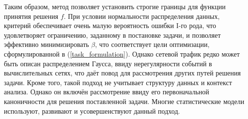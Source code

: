 Таким образом, метод позволяет установить строгие границы для функции принятия решения $f$. При условии нормальности распределения данных, критерий обеспечивает очень малую вероятность ошибки I-го рода, что удовлетворяет ограничению, заданному в постановке задачи, и позволяет эффективно минимизировать $\beta$, что соответствует цели оптимизации, сформулированной в (\ref{task_formulation}). Однако сетевой трафик редко может быть описан распределением Гаусса, ввиду нерегулярности событий в вычислительных сетях, что даёт повод для рассмотрения других путей решения задачи. Кроме того, такой подход не учитывает структуру данных и контекст анализа. Однако он включён рассмотрение ввиду его первоначальной каноничности для решения поставленной задачи. Многие статистические модели используют, развивают и усовершенствуют данный подход.
